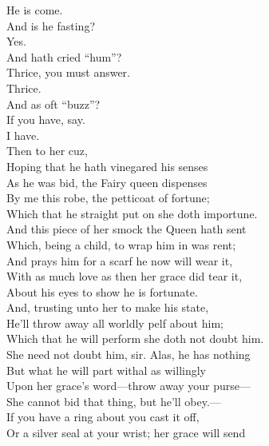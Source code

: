 \documentclass[a4paper,oneside,12pt]{memoir}
\begin{document}
\begin{drama*}
\facespeaks {} He is come.\\
\subtlespeaks And is he fasting?\\
\facespeaks {} Yes.\\
\subtlespeaks {} And hath cried ``hum''?\\
\facespeaks Thrice, you must answer.\\
\dapperspeaks {} Thrice.\\
\subtlespeaks {} And as oft ``buzz''?\\
\facespeaks If you have, say.\\
\dapperspeaks {} I have.\\
\subtlespeaks {} Then to her cuz,\\
Hoping that he hath vinegared his senses\\
As he was bid, the Fairy queen dispenses\\
By me this robe, the petticoat of fortune;\\
Which that he straight put on she doth importune.\\
And this piece of her smock the Queen hath sent\\
Which, being a child, to wrap him in was rent;\\
And prays him for a scarf he now will wear it,\\
With as much love as then her grace did tear it,\\
About his eyes to show he is fortunate.\\
And, trusting unto her to make his state,\\
He'll throw away all worldly pelf about him;\\
Which that he will perform she doth not doubt him.\\
\facespeaks She need not doubt him, sir. Alas, he has nothing\\
But what he will part withal as willingly\\
Upon her grace's word---throw away your purse---\\
She cannot bid that thing, but he'll obey.---\\
If you have a ring about you cast it off,\\
Or a silver seal at your wrist; her grace will send\\

\end{drama*}
\end{document}
